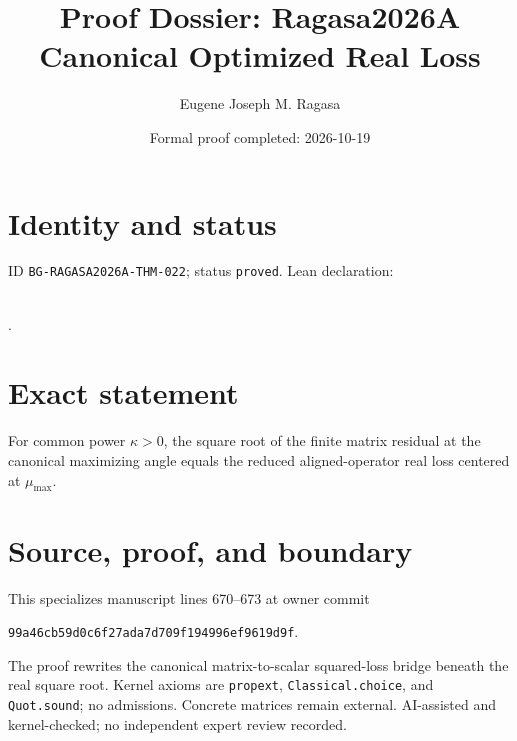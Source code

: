 \documentclass[11pt]{article}
\title{Proof Dossier: Ragasa2026A Canonical Optimized Real Loss}\author{Eugene Joseph M. Ragasa}\date{Formal proof completed: 2026-10-19}
\begin{document}
\maketitle
\section{Identity and status}
ID \texttt{BG-RAGASA2026A-THM-022}; status \texttt{proved}. Lean declaration:
\par{}\\
{\tiny{}}.
\section{Exact statement}
For common power $\kappa>0$, the square root of the finite matrix residual at the
canonical maximizing angle equals the reduced aligned-operator real loss centered at
$\mu_{\max}$.
\section{Source, proof, and boundary}
This specializes manuscript lines 670--673 at owner commit
\begin{center}\small\texttt{99a46cb59d0c6f27ada7d709f194996ef9619d9f}.\end{center}
The proof rewrites the canonical matrix-to-scalar squared-loss bridge beneath the real
square root. Kernel axioms are \texttt{propext}, \texttt{Classical.choice}, and
\texttt{Quot.sound}; no admissions. Concrete matrices remain external. AI-assisted and
kernel-checked; no independent expert review recorded.
\end{document}
